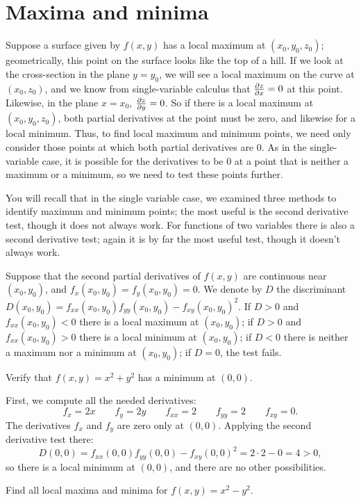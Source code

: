 \section{Maxima and minima}{}{}

Suppose a surface given by $f(x,y)$ has a local maximum at
$(x_0,y_0,z_0)$; geometrically, this point on the surface looks like
the top of a hill. If we look at the cross-section in the plane
$y=y_0$, we will see a local maximum on the curve at $(x_0,z_0)$, and
we know from single-variable calculus that ${\partial z\over\partial x}=0$
at this point. Likewise, in the plane $x=x_0$, ${\partial
  z\over\partial y}=0$. So if there is a local maximum at
$(x_0,y_0,z_0)$, both partial derivatives at the point must be zero,
and likewise for a local minimum. Thus, to find local maximum and
minimum points, we need only consider those points at which both
partial derivatives are 0. As in the single-variable case, it is
possible for the derivatives to be 0 at a point that is neither a
maximum or a minimum, so we need to test these points further.

You will recall that in the single variable case, we examined three
methods to identify maximum and minimum points; the most useful is the
second derivative test, though it does not always work. For functions
of two variables there is also a second derivative test; again it is
by far the most useful test, though it doesn't always work.

\thm Suppose that the second partial derivatives of $f(x,y)$ are
continuous near $(x_0,y_0)$, and $f_x(x_0,y_0)=f_y(x_0,y_0)=0$.
We denote by $D$ the {\dfont discriminant}
$D(x_0,y_0)=f_{xx}(x_0,y_0)f_{yy}(x_0,y_0)-f_{xy}(x_0,y_0)^2$.
If $D>0$ and $f_{xx}(x_0,y_0)<0$ there is a local maximum at $(x_0,y_0)$;
if $D>0$ and $f_{xx}(x_0,y_0)>0$ there is a local minimum at $(x_0,y_0)$;
if $D<0$ there is neither a maximum nor a minimum at $(x_0,y_0)$;
if $D=0$, the test fails.
\endthmnoproof

\example Verify that $f(x,y)=x^2+y^2$ has a minimum at $(0,0)$.

First, we compute all the needed derivatives:
$$f_x=2x \qquad f_y=2y \qquad f_{xx}=2 \qquad f_{yy}=2 \qquad
f_{xy}=0.$$
The derivatives $f_x$ and $f_y$ are zero only at $(0,0)$. Applying the
second derivative test there:
$$D(0,0)=f_{xx}(0,0)f_{yy}(0,0)-f_{xy}(0,0)^2=
2\cdot2-0=4>0,$$
so there is a local minimum at $(0,0)$, and there are no other
possibilities. 
\endexample

\example Find all local maxima and minima for $f(x,y)=x^2-y^2$.

